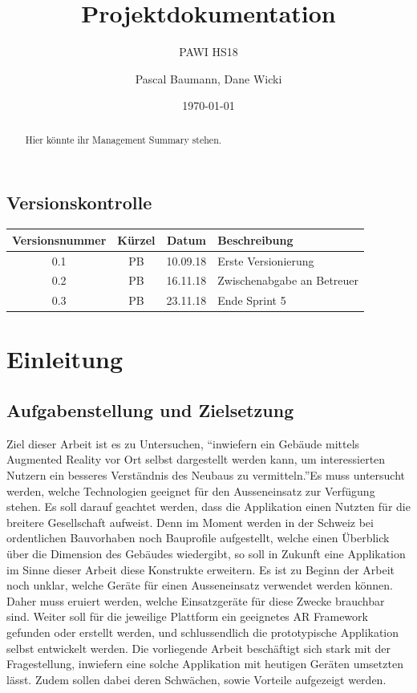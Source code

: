 \documentclass[a4paper]{scrreprt}
\title{Projektdokumentation}
\subtitle{PAWI HS18}
\author{Pascal Baumann, Dane Wicki}
\date{\today}
\begin{document}
\begin{titlepage}
\maketitle
\end{titlepage}

\renewcommand{\abstractname}{Management Summary}
\begin{abstract}
	Hier könnte ihr Management Summary stehen.
\end{abstract}

\section*{Versionskontrolle}

\begin{tabularx}{\textwidth}{|c|c|c|X|}
	\hline
	\textbf{Versionsnummer} & \textbf{Kürzel} & \textbf{Datum} & \textbf{Beschreibung} \\
	\hline
	0.1 & PB & 10.09.18 & Erste Versionierung \\
	\hline
	0.2 & PB & 16.11.18 & Zwischenabgabe an Betreuer \\
	\hline
	0.3 & PB & 23.11.18 & Ende Sprint 5\\
	\hline
\end{tabularx}

\tableofcontents

\clearpage
{}
\chapter{Einleitung}

\section{Aufgabenstellung und Zielsetzung}
Ziel dieser Arbeit ist es zu Untersuchen, \textquotedblleft inwiefern ein Gebäude mittels Augmented Reality vor Ort selbst dargestellt werden kann, um interessierten Nutzern ein besseres Verständnis des Neubaus zu vermitteln.\textquotedblright Es muss untersucht werden, welche Technologien geeignet für den Ausseneinsatz zur Verfügung stehen. Es soll darauf geachtet werden, dass die Applikation einen Nutzten für die breitere Gesellschaft aufweist. Denn im Moment werden in der Schweiz bei ordentlichen Bauvorhaben noch Bauprofile aufgestellt, welche einen Überblick über die Dimension des Gebäudes wiedergibt, so soll in Zukunft eine Applikation im Sinne dieser Arbeit diese Konstrukte erweitern.
\bigbreak
Es ist zu Beginn der Arbeit noch unklar, welche Geräte für einen Ausseneinsatz verwendet werden können. Daher muss eruiert werden, welche Einsatzgeräte für diese Zwecke brauchbar sind. Weiter soll für die jeweilige Plattform ein geeignetes AR Framework gefunden oder erstellt werden, und schlussendlich die prototypische Applikation selbst entwickelt werden.
\bigbreak
Die vorliegende Arbeit beschäftigt sich stark mit der Fragestellung, inwiefern eine solche Applikation mit heutigen Geräten umsetzten lässt. Zudem sollen dabei deren Schwächen, sowie Vorteile aufgezeigt werden.
\end{document}
